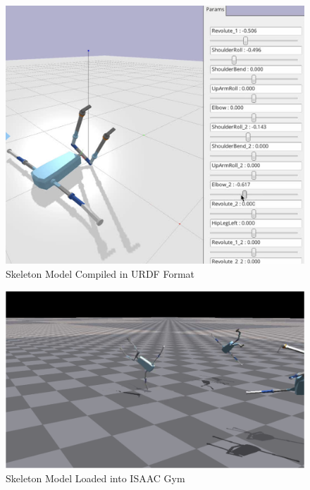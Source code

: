 \documentclass{article}
\begin{document}
\begin{figure}[H]
    \centering
    \includegraphics[scale=0.5]{assets/Design Presentation/KOL Build Skele.png}
    \caption{Skeleton Model Compiled in URDF Format}
    \label{fig:enter-label}
\end{figure}

\begin{figure}[H]
    \centering
    \includegraphics[scale=0.5]{assets/Design Presentation/Skele_ISAAC.png}
    \caption{Skeleton Model Loaded into ISAAC Gym}
    \label{fig:enter-label}
\end{figure}
\end{document}
